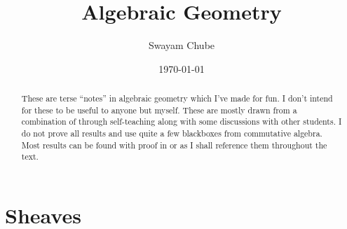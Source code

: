 \documentclass{amsart}
\title{Algebraic Geometry}
\author{Swayam Chube}
\date{\today}
\theoremstyle{thmstyle}
\theoremstyle{defstyle}
\begin{document}
\begin{abstract}
  These are terse ``notes'' in algebraic geometry which I've made for fun. I don't intend for these to be useful to anyone but myself. These are mostly drawn from a combination of \cite{vakil-foag} through self-teaching along with some discussions with other students. I do not prove all results and use quite a few blackboxes from commutative algebra. Most results can be found with proof in \cite{AM69} or \cite{Lan02} as I shall reference them throughout the text.
\end{abstract}
\maketitle
\tableofcontents
\newpage

\section{Sheaves}


\newpage


\end{document}
